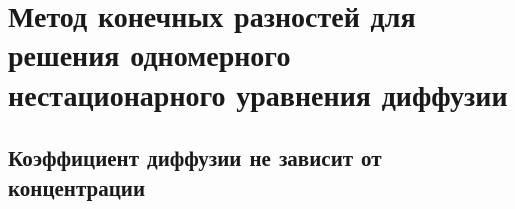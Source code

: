 \section{Метод конечных разностей для решения одномерного нестационарного уравнения диффузии}
\subsection{Коэффициент диффузии не зависит от концентрации}






